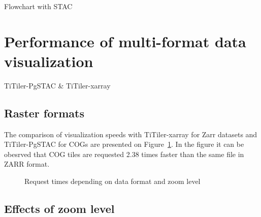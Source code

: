 \documentclass[
  oneside,
  open=any]{scrbook}
\begin{document}
Flowchart with STAC

\section{Performance of multi-format data
visualization}\label{performance-of-multi-format-data-visualization}

TiTiler-PgSTAC \& TiTiler-xarray

\subsection{Raster formats}\label{raster-formats}

The comparison of visualization speeds with TiTiler-xarray for Zarr
datasets and TiTiler-PgSTAC for COGs are presented on
Figure~\ref{fig-format-comp}. In the figure it can be obesrved that COG
tiles are requested 2.38 times faster than the same file in ZARR format.

\begin{figure}[H]


\caption{\label{fig-format-comp}Request times depending on data format
and zoom level}

\end{figure}%

\subsection{Effects of zoom level}\label{effects-of-zoom-level}
\end{document}
